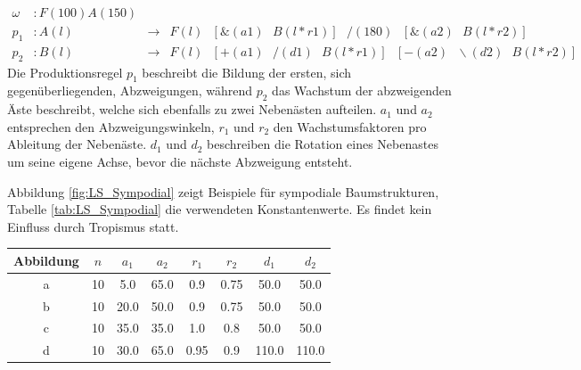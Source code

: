 \begin{equation}
\begin{array}{llll}
\omega & : F(100)A(150) \\
p_1 & : A(l) &\rightarrow& F(l)\text{ }[\&(a1)\text{ }B(l*r1)]\text{ }/(180)\text{ }[\&(a2)\text{ }B(l*r2)] \\
p_2 &  : B(l) &\rightarrow& F(l)\text{ }[+(a1)\text{ }/(d1)\text{ }B(l*r1)]\text{ }[-(a2)\text{ }\backslash(d2)\text{ }B(l*r2)]
\end{array}
\label{eq:ProdSympodial}
\end{equation} 
\cite[S.59]{ABOP:04}
Die Produktionsregel $p_1$ beschreibt die Bildung der ersten, sich gegenüberliegenden, Abzweigungen, während $p_2$ das Wachstum der abzweigenden Äste beschreibt, welche sich ebenfalls zu zwei Nebenästen aufteilen. $a_1$ und $a_2$ entsprechen den Abzweigungswinkeln, $r_1$ und $r_2$ den Wachstumsfaktoren pro Ableitung der Nebenäste. $d_1$ und $d_2$ beschreiben die Rotation eines Nebenastes um seine eigene Achse, bevor die nächste Abzweigung entsteht.

Abbildung \ref{fig:LS_Sympodial} zeigt Beispiele für sympodiale Baumstrukturen, Tabelle \ref{tab:LS_Sympodial} die verwendeten Konstantenwerte. Es findet kein Einfluss durch Tropismus statt.

\begin{center}
	\begin{tabulary}{\textwidth}{|C|C|C|C|C|C|C|C|}
		\hline 
		Abbildung & $n$ & $a_1$ & $a_2$ & $r_1$ & $r_2$ & $d_1$ & $d_2$ \\ 
		\hline 
		a & 10 & 5.0 & 65.0 & 0.9 & 0.75 & 50.0 & 50.0 \\ 
		\hline 
		b & 10 & 20.0 & 50.0 & 0.9 & 0.75 & 50.0 & 50.0 \\ 
		\hline 
		c & 10 & 35.0 & 35.0 & 1.0 & 0.8 & 50.0 & 50.0 \\ 
		\hline 
		d & 10 & 30.0 & 65.0 & 0.95 & 0.9 & 110.0 & 110.0 \\ 
		\hline 
	\end{tabulary} 
	\label{tab:LS_Sympodial}
\end{center}

